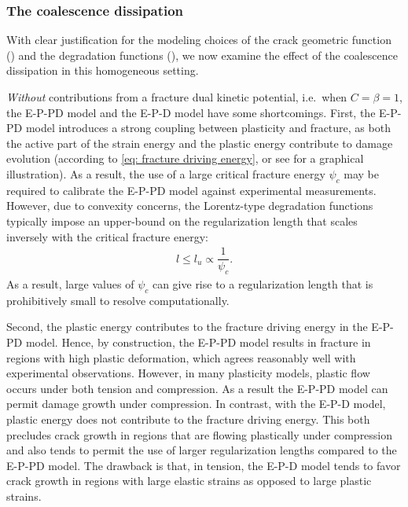 \subsubsection{The coalescence dissipation}
\label{section: Chapter5/verification/homogenized/coalescence}

With clear justification for the modeling choices of the crack geometric function () and the degradation functions (), we now examine the effect of the coalescence dissipation in this homogeneous setting.

\textit{Without} contributions from a fracture dual kinetic potential, i.e.\ when $C = \beta = 1$, the E-P-PD model and the E-P-D model have some shortcomings.
First, the E-P-PD model introduces a strong coupling between plasticity and fracture, as both the active part of the strain energy and the plastic energy contribute to damage evolution (according to \eqref{eq: fracture driving energy}, or see  for a graphical illustration). As a result, the use of a large critical fracture energy $\psi_c$ may be required to calibrate the E-P-PD model against experimental measurements. However, due to convexity concerns, the Lorentz-type degradation functions typically impose an upper-bound on the regularization length that scales inversely with the critical fracture energy:
\begin{align}
  l \leqslant l_u \propto \dfrac{1}{\psi_c}.
  \label{eq: upper bound}
\end{align}
As a result, large values of $\psi_c$ can give rise to a regularization length that is prohibitively small to resolve computationally.



Second, the plastic energy contributes to the fracture driving energy in the E-P-PD model. Hence, by construction, the E-P-PD model results in fracture in regions with high plastic deformation, which agrees reasonably well with experimental observations. However, in many plasticity models, plastic flow occurs under both tension and compression. As a result the E-P-PD model can permit damage growth under compression. In contrast, with the E-P-D model, plastic energy does not contribute to the fracture driving energy.  This both precludes crack growth in regions that are flowing plastically under compression and also tends to permit the use of larger regularization lengths compared to the E-P-PD model.  The drawback is that, in tension, the E-P-D model tends to favor crack growth in regions with large elastic strains as opposed to large plastic strains.

